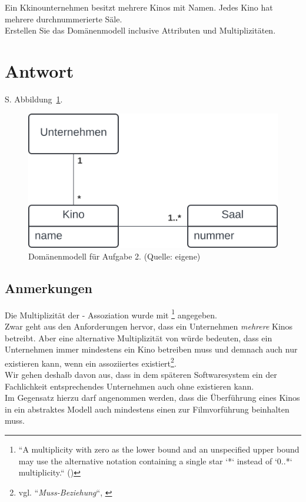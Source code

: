Ein Kkinounternehmen besitzt mehrere Kinos mit Namen.
Jedes Kino hat mehrere durchnummerierte Säle.\\
Erstellen Sie das Domänenmodell inclusive Attributen und Multiplizitäten.


\section*{Antwort}

S. Abbildung~\ref{fig:kino}.\\

\begin{figure}
    \centering
    \includegraphics[scale=0.5]{chapters/aufgabe 2/img/kino}
    \caption{Domänenmodell für Aufgabe 2. (Quelle: eigene)}
    \label{fig:kino}
\end{figure}

\subsection*{Anmerkungen}
Die Multiplizität der  -  Assoziation wurde mit \code{*}\footnote{
    ``A multiplicity with zero as the lower bound and an unspecified upper bound may use the alternative notation containing a single star `*` instead of `0..*`
    multiplicity.`` (\cite[35]{UML17})
} angegeben.\\
Zwar geht aus den Anforderungen hervor, dass ein Unternehmen \textit{mehrere} Kinos betreibt.
Aber eine alternative Multiplizität von  würde bedeuten, dass ein Unternehmen immer mindestens ein Kino betreiben muss und demnach auch nur existieren kann, wenn ein assoziiertes  existiert\footnote{
    vgl. ``\textit{Muss-Beziehung}``, \cite[166 ff.]{Bal05}
}.\\
Wir gehen deshalb davon aus, dass in dem späteren Softwaresystem ein der Fachlichkeit entsprechendes Unternehmen auch ohne  existieren kann.\\
Im Gegensatz hierzu darf angenommen werden, dass die Überführung eines Kinos in ein abstraktes Modell auch mindestens einen  zur Filmvorführung beinhalten muss.

